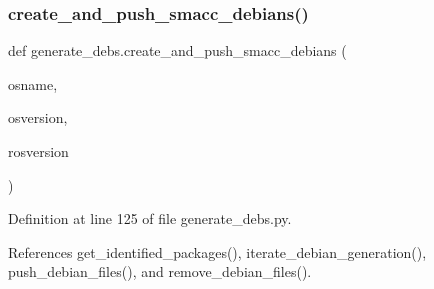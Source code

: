 \subsubsection{\texorpdfstring{create\+\_\+and\+\_\+push\+\_\+smacc\+\_\+debians()}{create\_and\_push\_smacc\_debians()}}
{\footnotesize\ttfamily def generate\+\_\+debs.\+create\+\_\+and\+\_\+push\+\_\+smacc\+\_\+debians (\begin{DoxyParamCaption}\item[{}]{osname,  }\item[{}]{osversion,  }\item[{}]{rosversion }\end{DoxyParamCaption})}



Definition at line 125 of file generate\+\_\+debs.\+py.



References get\+\_\+identified\+\_\+packages(), iterate\+\_\+debian\+\_\+generation(), push\+\_\+debian\+\_\+files(), and remove\+\_\+debian\+\_\+files().


